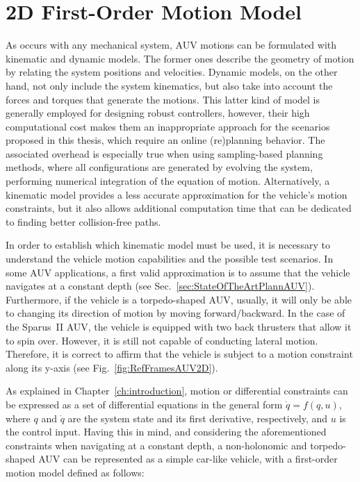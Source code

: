 \section{2D First-Order Motion Model}
\label{sec:2d_kinematic_model}

As occurs with any mechanical system, \ac{AUV} motions can be formulated with
kinematic and dynamic models. The former ones describe the geometry of motion by
relating the system positions and velocities. Dynamic models, on the other
hand, not only include the system kinematics, but also take into account the
forces and torques that generate the motions. This latter kind of model is
generally employed for designing robust controllers, however, their high
computational cost makes them an inappropriate approach for the scenarios
proposed in this thesis, which require an online (re)planning behavior. The
associated overhead is especially true when using sampling-based planning
methods, where all configurations are generated by evolving the system, \ie
performing numerical integration of the equation of motion. Alternatively, a
kinematic model provides a less accurate approximation for the vehicle's motion
constraints, but it also allows additional computation time that can be
dedicated to finding better collision-free paths.

In order to establish which kinematic model must be used, it is necessary to
understand the vehicle motion capabilities and the possible test scenarios. In
some \ac{AUV} applications, a first valid approximation is to assume that the
vehicle navigates at a constant depth (see
Sec.~\ref{sec:StateOfTheArtPlannAUV}). Furthermore, if the vehicle is a
torpedo-shaped \ac{AUV}, usually, it will only be able to changing its direction
of motion by moving forward/backward. In the case of the Sparus~II \ac{AUV}, the
vehicle is equipped with two back thrusters that allow it to spin over. However,
it is still not capable of conducting lateral motion. Therefore, it is correct
to affirm that the vehicle is subject to a motion constraint along its y-axis
(see Fig.~\ref{fig:RefFramesAUV2D}).

As explained in Chapter~\ref{ch:introduction}, motion or differential
constraints can be expressed as a set of differential equations in the general
form $\dot{q}=f\left(q,u\right)$, where $q$ and $\dot{q}$ are the system state
and its first derivative, respectively, and $u$ is the control input.
Having this in mind, and considering the aforementioned constraints when
navigating at a constant depth, a non-holonomic and torpedo-shaped \ac{AUV} can
be represented as a simple car-like vehicle, with a first-order motion model
defined as follows:

